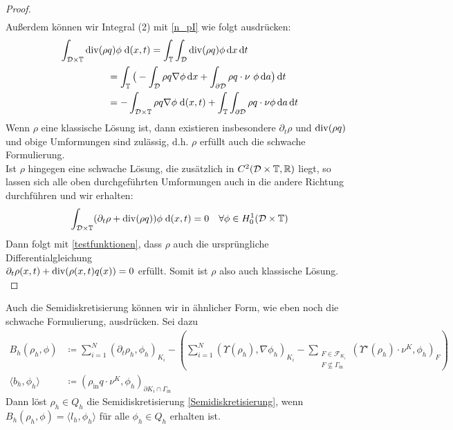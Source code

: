 \begin{proof}
\begin{align*}
	\end{align*}
	Außerdem können wir Integral (2) mit  \ref{n_pI} wie folgt ausdrücken:
	\begin{align*}
	\int_{\mathcal{D} \times \mathbb{T}}  
	\operatorname{div}(\rho &q ) \phi\; \mathrm{d} (x,t) = \int_{\mathbb{T}} \int_{\mathcal{D}} \operatorname{div}(\rho q ) \phi \, \mathrm{d} x \, \mathrm{d} t \\
	&= \int_{\mathbb{T}} \big( - \int_{\mathcal{D}} \rho q \nabla \phi \, \mathrm{d} x + \int_{\partial \mathcal{D}} \rho q \cdot \nu \ \phi \, \mathrm{d} a \big)  \, \mathrm{d} t \\
	&= - \int_{\mathcal{D} \times \mathbb{T}} \rho q \nabla \phi \; \mathrm{d} (x,t) + \int_{\mathbb{T}} \int_{\partial \mathcal{D}} \rho q \cdot \nu \phi \, \mathrm{d} a \, \mathrm{d} t 
	\end{align*}
	Wenn $ \rho  $ eine klassische Lösung ist, dann existieren insbesondere $ \partial_t \rho  $ und $ \operatorname{div}(\rho q) $ und obige Umformungen sind zulässig, d.h. $ \rho $ erfüllt auch die schwache Formulierung. \\
	Ist $ \rho $ hingegen eine schwache Lösung, die zusätzlich in $ C^2(\mathcal{D}\times\mathbb{T},\mathbb{R}) $ liegt, so lassen sich alle oben durchgeführten Umformungen auch in die andere Richtung durchführen und wir erhalten: 
	\[
	\int_{\mathcal{D}\times\mathbb{T}} (\partial_t\rho + \operatorname{div}(\rho q))\phi \; \mathrm{d} (x,t) = 0 \quad \forall \phi \in H_0^1(\mathcal{D}\times\mathbb{T}) 
	\] 
	Dann folgt mit \eqref{testfunktionen}, dass $ \rho $ auch die ursprüngliche Differentialgleichung\\
	$ \partial_t \rho(x,t) + \operatorname{div}(\rho(x,t) q(x)) = 0  $ erfüllt. Somit ist $ \rho $ also auch klassische Lösung.\\
	
\end{proof}

Auch die Semidiskretisierung können wir in ähnlicher Form, wie eben noch die schwache Formulierung, ausdrücken. Sei dazu
\begin{align*}
B_h(\rho_h,\phi) &\coloneqq \sum_{i=1}^{N} (\partial_t\rho_{h},\phi_h)_{K_i}  - \left( \sum_{i=1}^{N} (\Upsilon(\rho_h),\nabla \phi_h)_{K_i} - \sum_{\substack{F \in \mathcal{F}_{K_i} \\ F \not\subseteq \Gamma_{\text{in}}}} (\Upsilon^{\star}(\rho_h)\cdot \nu^K,\phi_h)_F\right) \\
\langle b_h , \phi_h \rangle &\coloneqq (\rho_{\text{in}}q \cdot \nu^K,\phi_h)_{\partial K_i \cap \Gamma_{\text{in}}}
\end{align*}
Dann löst $ \rho_h \in Q_h $ die Semidiskretisierung \eqref{Semidiskretisierung}, wenn $ B_h(\rho_{h},\phi) = \langle l_h,\phi_h \rangle  $ für alle $ \phi_h \in Q_h$ erhalten ist.



